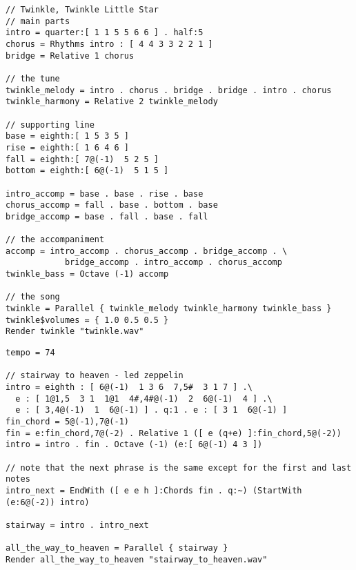 \documentclass{plt}
\begin{document}
\begin{frame}[fragile]
\fontsize{8pt}{8pt}\selectfont
\begin{verbatim}
// Twinkle, Twinkle Little Star
// main parts
intro = quarter:[ 1 1 5 5 6 6 ] . half:5
chorus = Rhythms intro : [ 4 4 3 3 2 2 1 ]
bridge = Relative 1 chorus

// the tune
twinkle_melody = intro . chorus . bridge . bridge . intro . chorus
twinkle_harmony = Relative 2 twinkle_melody

// supporting line
base = eighth:[ 1 5 3 5 ]
rise = eighth:[ 1 6 4 6 ]
fall = eighth:[ 7@(-1)  5 2 5 ]
bottom = eighth:[ 6@(-1)  5 1 5 ]

intro_accomp = base . base . rise . base
chorus_accomp = fall . base . bottom . base
bridge_accomp = base . fall . base . fall

// the accompaniment
accomp = intro_accomp . chorus_accomp . bridge_accomp . \
            bridge_accomp . intro_accomp . chorus_accomp
twinkle_bass = Octave (-1) accomp

// the song
twinkle = Parallel { twinkle_melody twinkle_harmony twinkle_bass }
twinkle$volumes = { 1.0 0.5 0.5 }
Render twinkle "twinkle.wav"
\end{verbatim}
\end{frame}

\begin{frame}[fragile]
\fontsize{8pt}{8pt}\selectfont
\begin{verbatim}
tempo = 74

// stairway to heaven - led zeppelin
intro = eighth : [ 6@(-1)  1 3 6  7,5#  3 1 7 ] .\
  e : [ 1@1,5  3 1  1@1  4#,4#@(-1)  2  6@(-1)  4 ] .\
  e : [ 3,4@(-1)  1  6@(-1) ] . q:1 . e : [ 3 1  6@(-1) ]
fin_chord = 5@(-1),7@(-1)
fin = e:fin_chord,7@(-2) . Relative 1 ([ e (q+e) ]:fin_chord,5@(-2))
intro = intro . fin . Octave (-1) (e:[ 6@(-1) 4 3 ])

// note that the next phrase is the same except for the first and last notes
intro_next = EndWith ([ e e h ]:Chords fin . q:~) (StartWith (e:6@(-2)) intro)

stairway = intro . intro_next

all_the_way_to_heaven = Parallel { stairway }
Render all_the_way_to_heaven "stairway_to_heaven.wav"
\end{verbatim}
\end{frame}
\end{document}

